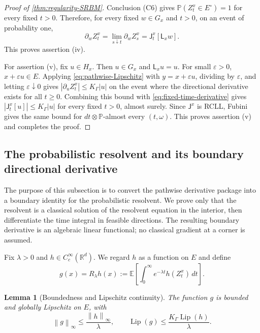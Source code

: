 \documentclass[aihp]{imsart}
\numberwithin{equation}{section}
\theoremstyle{plain}
\newtheorem{lemma}[lemma]{Lemma}
\theoremstyle{definition}
\newcommand{\R}{\mathbb R}
\newcommand{\Lip}{\operatorname{Lip}}
\newcommand{\1}{\mathbf 1}
\newcommand{\norm}[1]{\left\lVert #1\right\rVert}
\newcommand{\abs}[1]{\left\lvert #1\right\rvert}
\begin{document}
\begin{proof}[Proof of \cref{thm:regularity-SRBM}]
Conclusion \textup{(C6)} gives $\mathbb P(Z_t^x\in E^\circ)=1$ for every fixed
$t>0$.  Therefore, for every fixed $w\in G_x$ and $t>0$, on an event of
probability one,
\[
        \partial_w Z_t^x
        =
        \lim_{s\downarrow t}\partial_w Z_s^x
        =
        \mathsf J_t^x[\mathsf L_xw].
\]
This proves assertion \textup{(iv)}.

For assertion \textup{(v)}, fix $u\in H_x$.  Then $u\in G_x$ and
$\mathsf L_xu=u$.  For small $\varepsilon>0$, $x+\varepsilon u\in E$.  Applying
\eqref{eq:pathwise-Lipschitz} with $y=x+\varepsilon u$, dividing by
$\varepsilon$, and letting $\varepsilon\downarrow0$ gives
$\abs{\partial_u Z_t^x}\le K_\Gamma\abs{u}$ on the event where the directional
derivative exists for all $t\ge0$.  Combining this bound with
\eqref{eq:fixed-time-derivative} gives
$\abs{\mathsf J_t^x[u]}\le K_\Gamma\abs{u}$ for every fixed $t>0$, almost surely.
Since $\mathsf J^x$ is RCLL, Fubini gives the same bound for
$dt\otimes\mathbb P$-almost every $(t,\omega)$.  This proves assertion
\textup{(v)} and completes the proof.


\end{proof}





\subsection{The probabilistic resolvent and its boundary directional derivative}\label{sec:resolvent}

The purpose of this subsection is to convert the pathwise derivative package into a boundary identity for the probabilistic resolvent. We prove only that the resolvent is a classical solution of the resolvent equation in the interior, then differentiate the time integral in feasible directions. The resulting boundary derivative is an algebraic linear functional; no classical gradient at a corner is assumed.

Fix $\lambda>0$ and $h\in C_c^\infty(\R^d)$. We regard $h$ as a function on $E$ and define
\begin{equation}\label{eq:resolvent}
 g(x)=R_\lambda h(x)
 :=\mathbb E\left[\int_0^\infty e^{-\lambda t}h(Z_t^x)\,dt\right].
\end{equation}

\begin{lemma}[Boundedness and Lipschitz continuity]\label{lem:resolvent-Lipschitz}
The function $g$ is bounded and globally Lipschitz on $E$, with
\begin{equation}\label{eq:resolvent-bounds}
 \norm{g}_\infty\le\frac{\norm{h}_\infty}{\lambda},
 \qquad
 \Lip(g)\le\frac{K_\Gamma\Lip(h)}{\lambda}.
\end{equation}
\end{lemma}
\end{document}

